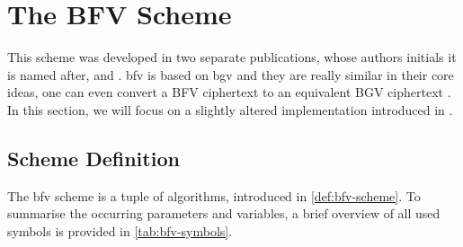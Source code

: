\pagebreak
\section{The BFV Scheme}
\label{sec:bfv}
This scheme was developed in two separate publications, whose authors initials it is named after, \cite{2012-brakerski} and \cite{2012-fv-original}.
\gls{bfv} is based on \gls{bgv} and they are really similar in their core ideas, one can even convert a BFV ciphertext to an equivalent BGV ciphertext \parencite{2021-he-revisiting}.
In this section, we will focus on a slightly altered implementation introduced in \cite{2014-fv-comparison}.

\subsection{Scheme Definition}
The \gls{bfv} scheme is a tuple of algorithms, introduced in \cref{def:bfv-scheme}.
To summarise the occurring parameters and variables, a brief overview of all used symbols is provided in \cref{tab:bfv-symbols}.


